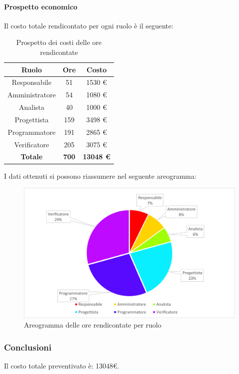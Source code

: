 \paragraph{Prospetto economico}
Il costo totale rendicontato per ogni ruolo è il seguente:
\begin{table}[H]
		\begin{center}
			\setlength{\aboverulesep}{0pt}
			\setlength{\belowrulesep}{0pt}
			\setlength{\extrarowheight}{.75ex}
			\begin{tabular}{ c c c }
				\rowcolor{AzzurroGruppo!30} 
				\textbf{Ruolo} & \textbf{Ore} & \textbf{Costo} \\
				\toprule
				Responsabile   & 51 & 1530 \euro \\
				Amministratore & 54 & 1080 \euro \\
				Analista       & 40 & 1000 \euro \\
				Progettista    & 159 & 3498 \euro \\
				Programmatore  & 191 & 2865 \euro \\
				Verificatore   & 205 & 3075 \euro \\
				\textbf{Totale} & \textbf{700} & \textbf{13048 \euro} \\
				\bottomrule
			\end{tabular}
			\caption{Prospetto dei costi delle ore rendicontate}
		\end{center}
	\end{table}
I dati ottenuti si possono riassumere nel seguente areogramma:
\begin{figure}[H]
    \centering
    \includegraphics[scale = 0.5]{components/img/Totale-rendicontate-torta.png}
    \caption{ Areogramma delle ore rendicontate per ruolo}
    \label{fig:Areogramma ripartizione ore totali rendicontate}
\end{figure}
\subsubsection{Conclusioni}
Il costo totale preventivato è: 13048\euro .